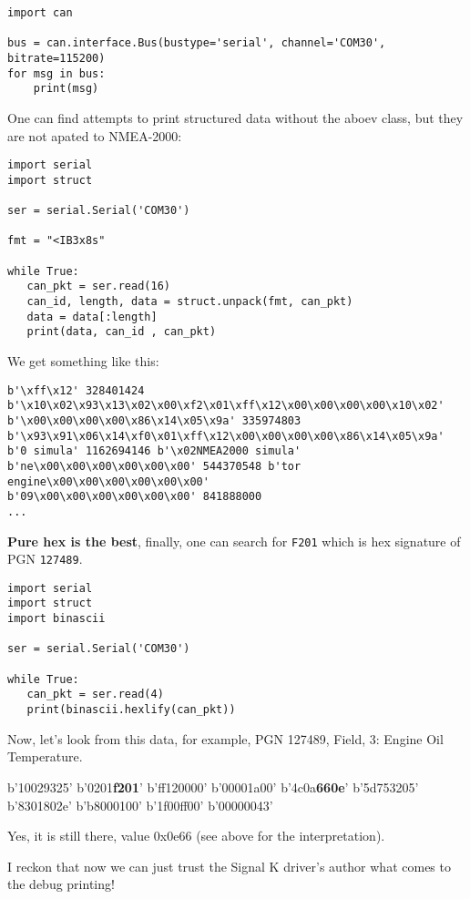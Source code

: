 \documentclass[11pt]{article}
\begin{document}
\begin{verbatim}
import can

bus = can.interface.Bus(bustype='serial', channel='COM30', bitrate=115200)
for msg in bus:
    print(msg)
\end{verbatim}

    One can find attempts to print structured data without the aboev class,
but they are not apated to NMEA-2000:

    \begin{verbatim}
import serial
import struct

ser = serial.Serial('COM30')

fmt = "<IB3x8s"

while True:
   can_pkt = ser.read(16)
   can_id, length, data = struct.unpack(fmt, can_pkt)
   data = data[:length]
   print(data, can_id , can_pkt)
\end{verbatim}

    We get something like this:

\begin{verbatim}
b'\xff\x12' 328401424 b'\x10\x02\x93\x13\x02\x00\xf2\x01\xff\x12\x00\x00\x00\x00\x10\x02'
b'\x00\x00\x00\x00\x86\x14\x05\x9a' 335974803 b'\x93\x91\x06\x14\xf0\x01\xff\x12\x00\x00\x00\x00\x86\x14\x05\x9a'
b'0 simula' 1162694146 b'\x02NMEA2000 simula'
b'ne\x00\x00\x00\x00\x00\x00' 544370548 b'tor engine\x00\x00\x00\x00\x00\x00'
b'09\x00\x00\x00\x00\x00\x00' 841888000
...
\end{verbatim}

    \textbf{Pure hex is the best}, finally, one can search for \texttt{F201}
which is hex signature of PGN \texttt{127489}.

    \begin{verbatim}
import serial
import struct
import binascii

ser = serial.Serial('COM30')

while True:
   can_pkt = ser.read(4)
   print(binascii.hexlify(can_pkt))
\end{verbatim}

    Now, let's look from this data, for example, PGN 127489, Field, 3:
Engine Oil Temperature.

    b'10029325' b'0201\textbf{f201}' b'ff120000' b'00001a00'
b'4c0a\textbf{660e}' b'5d753205' b'8301802e' b'b8000100' b'1f00ff00'
b'00000043'

    Yes, it is still there, value 0x0e66 (see above for the interpretation).

    I reckon that now we can just trust the Signal K driver's author what
comes to the debug printing!
\end{document}
